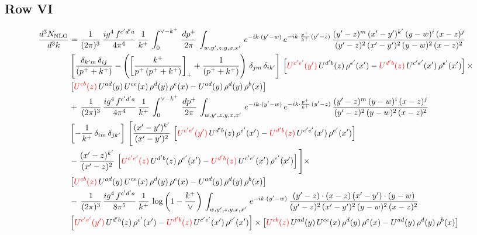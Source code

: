 \documentclass[9pt]{article}
\numberwithin{equation}{section}
\begin{document}
\subsection{Row VI}
\begin{align}
    \frac{d^{3}N_{\rm NLO}}{d^{3}k} & =  \frac{1}{(2\pi)^{3}}\, \frac{ig^{4}\,f^{c'd'a}}{4\pi^{4}}\, \frac{1}{k^{+}}\,\int_{0}^{\vee-k^{+}}\, \frac{dp^{+}}{2\pi}\, \int_{w,y',z,y,x,x'}\, e^{-ik\cdot (y'-w)}\, e^{-ik\cdot \frac{p^{+}}{k^{+}}\,(y'-z)}\,\frac{(y'-z)^{m}\,(x'-y')^{k'}\,(y-w)^{i}\,(x-z)^{j}}{(y'-z)^{2}\,(x'-y')^{2}\,(y-w)^{2}\,(x-z)^{2}}\notag \\ & \left[\frac{\delta_{k'm}\,\delta_{ij}}{(p^{+}+k^{+})}-\left(\left[\frac{k^{+}}{p^{+}\,(p^{+}+k^{+})}\right]_{+}+\frac{1}{(p^{+}+k^{+})}\right)\,\delta_{jm}\,\delta_{ik'}\right]\, \left[{\color{red}U^{c'e'}(y')}\,U^{d'b}(z)\,\rho^{e'}(x')-{\color{red}U^{d'b}(z)}\,U^{c'e'}(x')\,\rho^{e'}(x')\right]\times\notag \\ &  \left[{\color{red}U^{cb}(z)}\,U^{ad}(y)\,U^{ce}(x)\,\rho^{d}(y)\,\rho^{e}(x)-U^{ad}(y)\,\rho^{d}(y)\,\rho^{b}(x)\right] \notag \\ &  +\,\frac{1}{(2\pi)^{3}}\, \frac{ig^{4}\,f^{c'd'a}}{4\pi^{4}}\, \frac{1}{k^{+}}\,\int_{0}^{\vee-k^{+}}\, \frac{dp^{+}}{2\pi}\, \int_{w,y',z,y,x,x'}\, e^{-ik\cdot (y'-w)}\, e^{-ik\cdot \frac{p^{+}}{k^{+}}\,(y'-z)}\,\frac{(y'-z)^{m}\,(y-w)^{i}\,(x-z)^{j}}{(y'-z)^{2}\,(y-w)^{2}\,(x-z)^{2}}\notag \\ &  \left[-\frac{1}{k^{+}}\, \delta_{im}\, \delta_{jk'}\right]\, \Bigg[\frac{(x'-y')^{k'}}{(x'-y')^{2}}\,\left[{\color{red}U^{c'e'}(y')}\,U^{d'b}(z)\,\rho^{e'}(x')-{\color{red}U^{d'b}(z)}\,U^{c'e'}(x')\,\rho^{e'}(x')\right]\notag \\ & -\frac{(x'-z)^{k'}}{(x'-z)^{2}}\,\left[{\color{red}U^{c'e'}(z)}\,U^{d'b}(z)\,\rho^{e'}(x')-{\color{red}U^{d'b}(z)}\,U^{c'e'}(x')\,\rho^{e'}(x')\right]\Bigg]\times\notag \\ &    \left[{\color{red}U^{cb}(z)}\,U^{ad}(y)\,U^{ce}(x)\,\rho^{d}(y)\,\rho^{e}(x)-U^{ad}(y)\,\rho^{d}(y)\,\rho^{b}(x)\right] \notag \\
&  -\,\frac{1}{(2\pi)^{3}}\, \frac{ig^{4}\,f^{c'd'a}}{8\pi^{5}}\, \frac{1}{k^{+}}\,\log{\left(1-\frac{k^{+}}{\vee}\right)}\, \int_{w,y',z,y,x,x'}\, e^{-ik\cdot (y'-w)}\,\frac{(y'-z)\cdot (x-z)\,(x'-y')\cdot (y-w)}{(y'-z)^{2}\,(x'-y')^{2}\,(y-w)^{2}\,(x-z)^{2}}\notag \\ & \left[{\color{red}U^{c'e'}(y')}\,U^{d'b}(z)\,\rho^{e'}(x')-{\color{red}U^{d'b}(z)}\,U^{c'e'}(x')\,\rho^{e'}(x')\right]\times  \left[{\color{red}U^{cb}(z)}\,U^{ad}(y)\,U^{ce}(x)\,\rho^{d}(y)\,\rho^{e}(x)-U^{ad}(y)\,\rho^{d}(y)\,\rho^{b}(x)\right]
\end{align}
\end{document}
